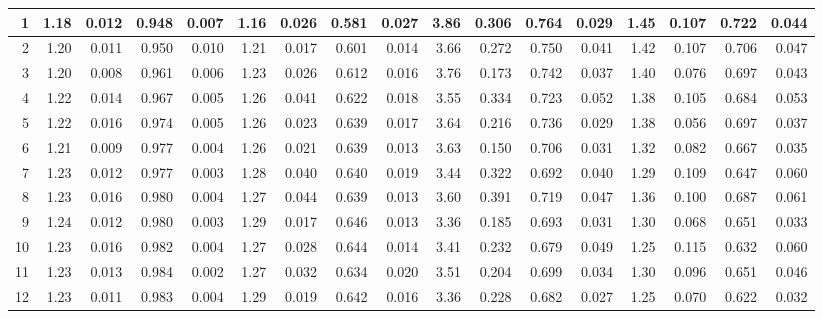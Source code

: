 \documentclass[
]{article}
\begin{document}
\begin{table}[H]
{\begin{tabular}[t]{r|r|r|r|r|r|r|r|r|r|r|r|r|r|r|r|r}
\hline
\hspace{1em}1 & 1.18 & 0.012 & 0.948 & 0.007 & 1.16 & 0.026 & 0.581 & 0.027 & 3.86 & 0.306 & 0.764 & 0.029 & 1.45 & 0.107 & 0.722 & 0.044\\
\hline
\hspace{1em}2 & 1.20 & 0.011 & 0.950 & 0.010 & 1.21 & 0.017 & 0.601 & 0.014 & 3.66 & 0.272 & 0.750 & 0.041 & 1.42 & 0.107 & 0.706 & 0.047\\
\hline
\hspace{1em}3 & 1.20 & 0.008 & 0.961 & 0.006 & 1.23 & 0.026 & 0.612 & 0.016 & 3.76 & 0.173 & 0.742 & 0.037 & 1.40 & 0.076 & 0.697 & 0.043\\
\hline
\hspace{1em}4 & 1.22 & 0.014 & 0.967 & 0.005 & 1.26 & 0.041 & 0.622 & 0.018 & 3.55 & 0.334 & 0.723 & 0.052 & 1.38 & 0.105 & 0.684 & 0.053\\
\hline
\hspace{1em}5 & 1.22 & 0.016 & 0.974 & 0.005 & 1.26 & 0.023 & 0.639 & 0.017 & 3.64 & 0.216 & 0.736 & 0.029 & 1.38 & 0.056 & 0.697 & 0.037\\
\hline
\hspace{1em}6 & 1.21 & 0.009 & 0.977 & 0.004 & 1.26 & 0.021 & 0.639 & 0.013 & 3.63 & 0.150 & 0.706 & 0.031 & 1.32 & 0.082 & 0.667 & 0.035\\
\hline
\hspace{1em}7 & 1.23 & 0.012 & 0.977 & 0.003 & 1.28 & 0.040 & 0.640 & 0.019 & 3.44 & 0.322 & 0.692 & 0.040 & 1.29 & 0.109 & 0.647 & 0.060\\
\hline
\hspace{1em}8 & 1.23 & 0.016 & 0.980 & 0.004 & 1.27 & 0.044 & 0.639 & 0.013 & 3.60 & 0.391 & 0.719 & 0.047 & 1.36 & 0.100 & 0.687 & 0.061\\
\hline
\hspace{1em}9 & 1.24 & 0.012 & 0.980 & 0.003 & 1.29 & 0.017 & 0.646 & 0.013 & 3.36 & 0.185 & 0.693 & 0.031 & 1.30 & 0.068 & 0.651 & 0.033\\
\hline
\hspace{1em}10 & 1.23 & 0.016 & 0.982 & 0.004 & 1.27 & 0.028 & 0.644 & 0.014 & 3.41 & 0.232 & 0.679 & 0.049 & 1.25 & 0.115 & 0.632 & 0.060\\
\hline
\hspace{1em}11 & 1.23 & 0.013 & 0.984 & 0.002 & 1.27 & 0.032 & 0.634 & 0.020 & 3.51 & 0.204 & 0.699 & 0.034 & 1.30 & 0.096 & 0.651 & 0.046\\
\hline
\hspace{1em}12 & 1.23 & 0.011 & 0.983 & 0.004 & 1.29 & 0.019 & 0.642 & 0.016 & 3.36 & 0.228 & 0.682 & 0.027 & 1.25 & 0.070 & 0.622 & 0.032\\

\end{tabular}}
\end{table}
\end{document}
